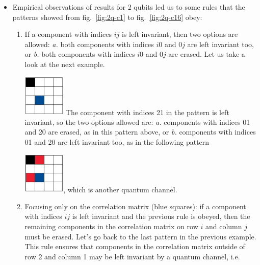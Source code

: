 \documentclass[11pt,dvipsnames]{article} %
\newcommand{\fref}[1]{fig.~\ref{#1}}  \newcommand{\tref}[1]{table~\ref{#1}}
\newcommand{\h}[1]{\colorbox{Yellow}{#1}}
\newcommand{\1}{\mathds{1}}
\begin{document}
\begin{itemize}
\item Empirical observations of results for 2 qubits 
led us to some rules that the
patterns showed from \fref{fig:2q-c1} to \fref{fig:2q-c16} obey:
\begin{enumerate}
\item If a component with indices $ij$ is left invariant, then two options are
allowed: \textit{a.} both components with indices $i0$ and $0j$ are left
invariant too, or \textit{b.} both components with indices $i0$ and $0j$ are
erased.
\janote{\h{Inicio}}
Let us take a look at the next example. \newline

\hfill
\includegraphics[width=2cm]{img/ex-2q2c-empiricalRule}
\hfill \hfill
\newline
The component with indices 21 in the pattern is left invariant,
so the two options allowed are: \textit{a.} components with indices 01 and
20 are erased, as in this pattern above, or \textit{b.} components 
with indices 01 and 20 are left invariant too, 
as in the following pattern \newline

\hfill
\includegraphics[width=2cm]{img/ex-2q4c-empiricalRule},
\hfill \hfill 
\newline
which is another quantum channel.

\item Focusing only on the correlation matrix (blue squares): if a component
with indices $ij$ is left invariant and the previous rule is obeyed, then the
remaining components in the correlation matrix on row $i$ and column $j$ must
be erased. 
Let's go back to the last pattern in the previous example. This rule 
ensures that components in the correlation matrix outside of row 2 and 
column 1 may be left invariant by a quantum channel, i.e.\newline


\end{enumerate}
\end{itemize}
\end{document}
